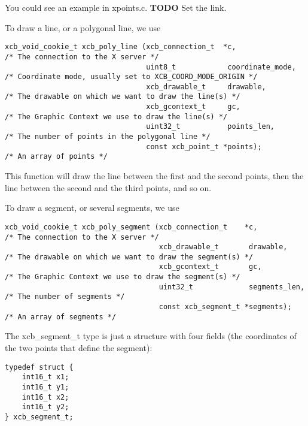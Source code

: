 \documentclass[12pt,oneside,titlepage]{book}
\begin{document}
\begin{enumerate}
\begin{enumerate}
    You could see an example in xpoints.c. \textbf{TODO} Set the link.

    To draw a line, or a polygonal line, we use

\begin{verbatim}
xcb_void_cookie_t xcb_poly_line (xcb_connection_t  *c,               /* The connection to the X server */
                                 uint8_t            coordinate_mode, /* Coordinate mode, usually set to XCB_COORD_MODE_ORIGIN */
                                 xcb_drawable_t     drawable,        /* The drawable on which we want to draw the line(s) */
                                 xcb_gcontext_t     gc,              /* The Graphic Context we use to draw the line(s) */
                                 uint32_t           points_len,      /* The number of points in the polygonal line */
                                 const xcb_point_t *points);         /* An array of points */
\end{verbatim}

    This function will draw the line between the first and the second
    points, then the line between the second and the third points, and
    so on.

    To draw a segment, or several segments, we use

\begin{verbatim}
xcb_void_cookie_t xcb_poly_segment (xcb_connection_t    *c,              /* The connection to the X server */
                                    xcb_drawable_t       drawable,       /* The drawable on which we want to draw the segment(s) */
                                    xcb_gcontext_t       gc,             /* The Graphic Context we use to draw the segment(s) */
                                    uint32_t             segments_len,   /* The number of segments */
                                    const xcb_segment_t *segments);      /* An array of segments */
\end{verbatim}

    The {xcb\_segment\_t} type is just a structure with four fields (the
    coordinates of the two points that define the segment):

\begin{verbatim}
typedef struct {
    int16_t x1;
    int16_t y1;
    int16_t x2;
    int16_t y2;
} xcb_segment_t;
\end{verbatim}


\end{enumerate}
\end{enumerate}
\end{document}
